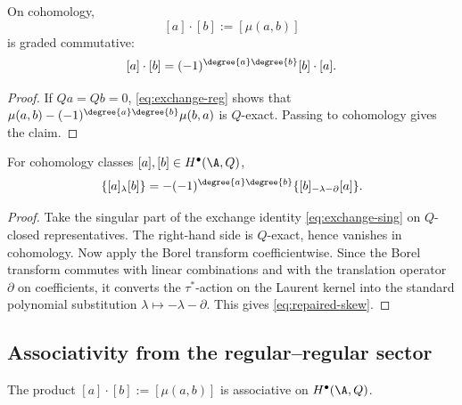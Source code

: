 \begin{proposition}
\label{prop:product-commutative}
On cohomology,
\[
[a]\cdot[b]:=[\mu(a,b)]
\]
is graded commutative:
\[
[a]\cdot[b]=(-1)^{\degree{a}\degree{b}}[b]\cdot[a].
\]
\end{proposition}

\begin{proof}
If $Qa=Qb=0$, \eqref{eq:exchange-reg} shows that
$\mu(a,b)-(-1)^{\degree{a}\degree{b}}\mu(b,a)$ is $Q$-exact. Passing to
cohomology gives the claim.
\end{proof}

\begin{proposition}
\label{prop:PVA2_proof}
For cohomology classes $[a],[b]\in H^\bullet(\A,Q)$,
\begin{equation}
\label{eq:repaired-skew}
\{[a]_\lambda [b]\}
=
-(-1)^{\degree{a}\degree{b}}
\{[b]_{-\lambda-\partial}[a]\}.
\end{equation}
\end{proposition}

\begin{proof}
Take the singular part of the exchange identity \eqref{eq:exchange-sing} on
$Q$-closed representatives. The right-hand side is $Q$-exact, hence vanishes in
cohomology. Now apply the Borel transform coefficientwise. Since the Borel transform
commutes with linear combinations and with the translation operator $\partial$ on
coefficients, it converts the $\tau^\ast$-action on the Laurent kernel into the standard
polynomial substitution $\lambda\mapsto-\lambda-\partial$. This gives
\eqref{eq:repaired-skew}.
\end{proof}

\subsection{Associativity from the regular--regular sector}

\begin{proposition}
\label{prop:product-associative}
The product $[a]\cdot[b]:=[\mu(a,b)]$ is associative on $H^\bullet(\A,Q)$.
\end{proposition}

